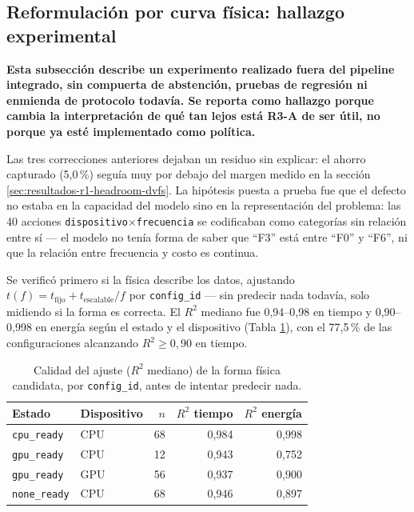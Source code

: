 \documentclass[12pt,oneside,spanish]{book}
\begin{document}
\subsection{Reformulación por curva física: hallazgo experimental}
\label{sec:resultados-r3-curva-fisica}

\textbf{Esta subsección describe un experimento realizado fuera del pipeline integrado, sin compuerta de abstención, pruebas de regresión ni enmienda de protocolo todavía. Se reporta como hallazgo porque cambia la interpretación de qué tan lejos está R3-A de ser útil, no porque ya esté implementado como política.}

Las tres correcciones anteriores dejaban un residuo sin explicar: el ahorro capturado (5,0\,\%) seguía muy por debajo del margen medido en la sección \ref{sec:resultados-r1-headroom-dvfs}. La hipótesis puesta a prueba fue que el defecto no estaba en la capacidad del modelo sino en la representación del problema: las 40 acciones \texttt{dispositivo$\times$frecuencia} se codificaban como categorías sin relación entre sí --- el modelo no tenía forma de saber que ``F3'' está entre ``F0'' y ``F6'', ni que la relación entre frecuencia y costo es continua.

Se verificó primero si la física describe los datos, ajustando $t(f) = t_{\text{fijo}} + t_{\text{escalable}}/f$ por \texttt{config\_id} --- sin predecir nada todavía, solo midiendo si la forma es correcta. El $R^2$ mediano fue 0,94--0,98 en tiempo y 0,90--0,998 en energía según el estado y el dispositivo (Tabla \ref{tab:r3-curva-r2}), con el 77,5\,\% de las configuraciones alcanzando $R^2 \geq 0{,}90$ en tiempo.

\begin{table}[H]
\centering
\caption[Ajuste de la forma física $t(f)=a+b/f$ por estado y dispositivo]{Calidad del ajuste ($R^2$ mediano) de la forma física candidata, por \texttt{config\_id}, antes de intentar predecir nada.}
\label{tab:r3-curva-r2}
\begin{tabular}{llrrr}
\toprule
\textbf{Estado} & \textbf{Dispositivo} & \textbf{$n$} & \textbf{$R^2$ tiempo} & \textbf{$R^2$ energía} \\
\midrule
\texttt{cpu\_ready}  & CPU & 68 & 0,984 & 0,998 \\
\texttt{gpu\_ready}  & CPU & 12 & 0,943 & 0,752 \\
\texttt{gpu\_ready}  & GPU & 56 & 0,937 & 0,900 \\
\texttt{none\_ready} & CPU & 68 & 0,946 & 0,897 \\
\bottomrule
\end{tabular}
\end{table}
\end{document}
